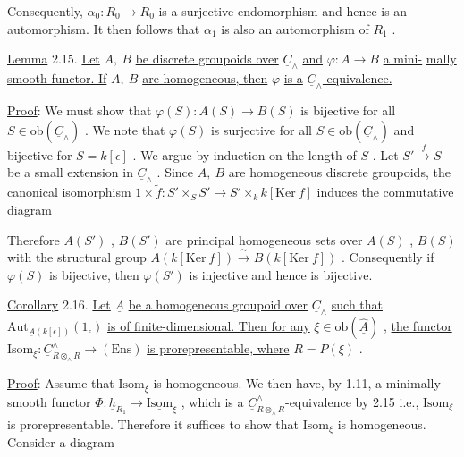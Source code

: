 Consequently, $\alpha_0 : R_0 \to R_0$ is a surjective endomorphism and hence is an automorphism. It then follows that $\alpha_1$ is also an automorphism of $R_1$ .

\underline{Lemma} 2.15.  \underline{Let} $A,\ B$ \underline{be discrete groupoids over} $\underline{C}_\wedge$ \underline{and} $\varphi : A \to B$ \underline{a mini-} \underline{mally smooth functor. If} $A,\ B$ \underline{are homogeneous, then} $\varphi$ \underline{is a} $\underline{C}_\wedge$\underline{-equivalence.}

\underline{Proof}:  We must show that $\varphi(S) : A(S) \longrightarrow B(S)$ is bijective for all $S \in \mathrm{ob}(\underline{C}_\wedge)$ . We note that $\varphi(S)$ is surjective for all $S \in \mathrm{ob}(\underline{C}_\wedge)$ and bijective for $S = k[\epsilon]$ . We argue by induction on the length of $S$ . Let $S' \overset{f}{\longrightarrow} S$ be a small extension in $\underline{C}_\wedge$ . Since $A,\ B$ are homogeneous discrete groupoids, the canonical isomorphism $1 \times \tilde{f} : S' \times_S S' \longrightarrow S' \times_k k[\mathrm{Ker}\ f]$ induces the commutative diagram
Therefore  $A(S')$ , $B(S')$  are principal homogeneous sets over  $A(S)$ , $B(S)$  with the structural group  $A(k[\mathrm{Ker}\ f]) \xrightarrow{\ \sim\ } B(k[\mathrm{Ker}\ f])$  . Consequently if  $\varphi(S)$  is bijective, then  $\varphi(S')$  is injective and hence is bijective.

\underline{Corollary} 2.16.  \underline{Let}  $\underline{A}$  \underline{be a homogeneous groupoid over}  $\underline{C}_{\wedge}$  \underline{such that} $\mathrm{Aut}_{\underline{A}(k[\epsilon])}(1_{\epsilon})$  \underline{is of finite-dimensional. Then for any}  $\xi \in \mathrm{ob}(\hat{\underline{A}})$  , \underline{the functor} $\mathrm{Isom}_{\xi} : \underline{C}^{\wedge}_{R \otimes_{\wedge} R} \longrightarrow (\mathrm{Ens})$  \underline{is prorepresentable, where}  $R = P(\xi)$  .

\underline{Proof}:  Assume that  $\mathrm{Isom}_{\xi}$  is homogeneous. We then have, by 1.11, a minimally smooth functor  $\Phi : \underline{h}_{R_{1}} \to \underline{\mathrm{Isom}}_{\xi}$  , which is a  $\underline{C}^{\wedge}_{R \otimes_{\wedge} R}$-equivalence by 2.15 i.e., $\mathrm{Isom}_{\xi}$  is prorepresentable. Therefore it suffices to show that  $\mathrm{Isom}_{\xi}$  is homogeneous. Consider a diagram

